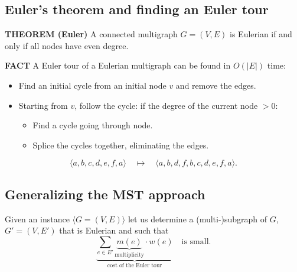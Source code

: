 \subsection{Euler's theorem and finding an Euler tour}
\begin{notestheorem}
\textbf{THEOREM (Euler)} A connected multigraph $G=(V,E)$ is Eulerian if and only if all nodes have even degree.
\end{notestheorem}
\begin{notesresult}
\textbf{FACT} A Euler tour of a Eulerian multigraph can be found in $O(|E|)$ time:
\end{notesresult}
\begin{itemize}
\item Find an initial cycle from an initial node $v$ and remove the edges.
\item Starting from $v$, follow the cycle: if the degree of the current node $>0$:
\begin{itemize}
\item Find a cycle going through node.
\item Splice the cycles together, eliminating the edges.
\end{itemize}
\end{itemize}
\[\langle a,b,c,d,e,f,a\rangle\quad\longmapsto\quad
\langle a,b,d,f,b,c,d,e,f,a\rangle.\]
\subsection{Generalizing the MST approach}
Given an instance $\langle G=(V,E)\rangle$ let us determine a (multi-)subgraph of $G$, $G'=(V,E')$ that is Eulerian and such that
\[\underbrace{\sum_{e\in E'}\underbrace{m(e)}_{\text{multiplicity}}\cdot w(e)}_{\text{cost of the Euler tour}}\quad\text{is small.}\]
